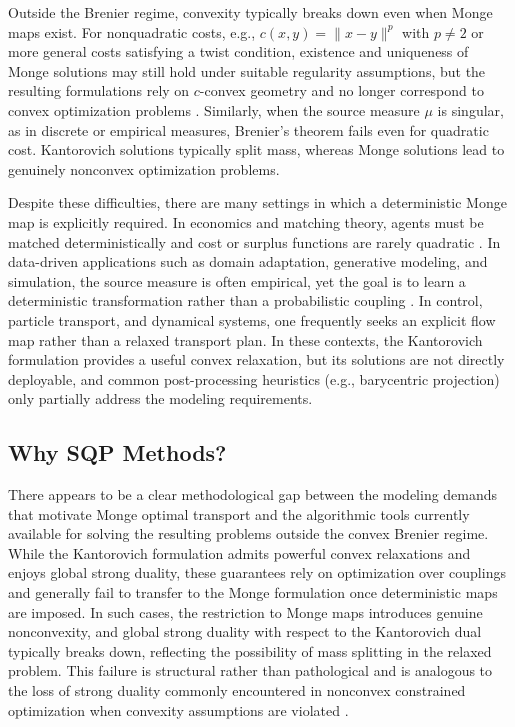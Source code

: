 \documentclass[12pt,leqno]{amsart}
\begin{document}
Outside the Brenier regime, convexity typically breaks down even when Monge maps exist. For nonquadratic costs, e.g., $c(x,y)=\|x-y\|^p$ with $p\neq 2$ or more general costs satisfying a twist condition, existence and uniqueness of Monge solutions may still hold under suitable regularity assumptions, but the resulting formulations rely on $c$-convex geometry and no longer correspond to convex optimization problems \citep{GangboMcCann1996,Villani2009}. Similarly, when the source measure $\mu$ is singular, as in discrete or empirical measures, Brenier's theorem fails even for quadratic cost. Kantorovich solutions typically split mass, whereas Monge solutions lead to genuinely nonconvex optimization problems.

Despite these difficulties, there are many settings in which a deterministic Monge map is explicitly required. In economics and matching theory, agents must be matched deterministically and cost or surplus functions are rarely quadratic \citep{Galichon2016}. In data-driven applications such as domain adaptation, generative modeling, and simulation, the source measure is often empirical, yet the goal is to learn a deterministic transformation rather than a probabilistic coupling \citep{Arjovsky2017,PeyreCuturi2019}. In control, particle transport, and dynamical systems, one frequently seeks an explicit flow map rather than a relaxed transport plan. In these contexts, the Kantorovich formulation provides a useful convex relaxation, but its solutions are not directly deployable, and common post-processing heuristics (e.g., barycentric projection) only partially address the modeling requirements.

\subsection{Why SQP Methods?} There appears to be a clear methodological gap between the modeling demands that motivate Monge optimal transport and the algorithmic tools currently available for solving the resulting problems outside the convex Brenier regime. While the Kantorovich formulation admits powerful convex relaxations and enjoys global strong duality, these guarantees rely on optimization over couplings and generally fail to transfer to the Monge formulation once deterministic maps are imposed. In such cases, the restriction to Monge maps introduces genuine nonconvexity, and global strong duality with respect to the Kantorovich dual typically breaks down, reflecting the possibility of mass splitting in the relaxed problem. This failure is structural rather than pathological and is analogous to the loss of strong duality commonly encountered in nonconvex constrained optimization when convexity assumptions are violated \citep{Luenberger1969,Bertsekas1999}.
\end{document}
